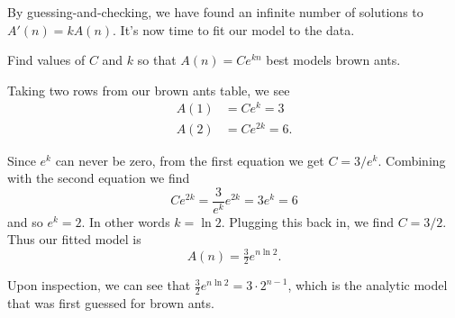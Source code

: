 By guessing-and-checking, we have found an infinite number of solutions to $A'(n)=kA(n)$.  It's now time to fit our
model to the data.

\begin{example}
	Find values of $C$ and $k$ so that $A(n)=Ce^{kn}$ best models brown ants.

	Taking two rows from our brown ants table, we see
	\begin{align*}
		A(1) &= Ce^{k} = 3\\
		A(2) & = Ce^{2k}=6.
	\end{align*}

	Since $e^k$ can never be zero, from the first equation we get $C=3/e^k$. Combining with the second equation we find
	\[
		Ce^{2k}=\frac{3}{e^k}e^{2k}=3e^k=6
	\]
	and so $e^k=2$. In other words $k=\ln 2$. Plugging this back in, we find $C=3/2$. Thus our fitted model is
	\[
		A(n)=\tfrac{3}{2}e^{n\ln 2}.
	\]
\end{example}

Upon inspection, we can see that $\tfrac{3}{2}e^{n\ln 2} = 3\cdot 2^{n-1}$, which is the analytic model
that was first guessed for brown ants.



%
%
%



